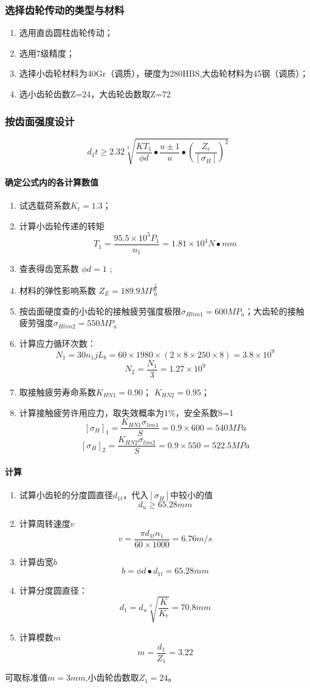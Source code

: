 \documentclass[a4paper,12pt]{article}
\begin{document}
\subsubsection{选择齿轮传动的类型与材料}
\begin{enumerate}
\item 选用直齿圆柱齿轮传动；
\item 选用7级精度；
\item 选择小齿轮材料为40Gr（调质），硬度为280HBS,大齿轮材料为45钢（调质）；
\item 选小齿轮齿数Z=24，大齿轮齿数取Z=72
\end{enumerate}

\subsubsection{按齿面强度设计}
$$  d_1t \geq 2.32\sqrt[3]{\frac{KT_1}{\phi d} \bullet \frac{u\pm 1}{u} \bullet \left( \frac{Z_e}{[\sigma _H]}   \right)^2} $$
\paragraph{确定公式内的各计算数值}
\begin{enumerate}
	\item 试选载荷系数$K_t=1.3$；
	\item 计算小齿轮传递的转矩  $$ T_1=\frac{95.5\times 10^5 P_1}{n_1}=1.81\times 10^4 N\bullet mm$$
	\item 查表得齿宽系数 $ \phi d=1$ ;
	\item 材料的弹性影响系数 $Z_E=189.9 MP_0^{\frac{1}{2}}$
	\item 按齿面硬度查的小齿轮的接触疲劳强度极限$\sigma _{H lim1}=600MP_a $；大齿轮的接触疲劳强度$\sigma _{H lim2}=550MP_a $
	\item 计算应力循环次数： $$N_1=30n_1jL_b=60\times 1980 \times (2\times 8\times 250\times 8)=3.8\times 10^9$$
	$$N_2=\frac{N_1}{3}=1.27\times 10^9$$
	\item 取接触疲劳寿命系数$K_{HN1}=0.90$； $K_{HN2}=0.95$；
	\item  计算接触疲劳许用应力，取失效概率为1\%，安全系数S=1
	 $$ [\sigma_H]_1= \frac{K_{HN1}\sigma_{lim1}}{S} =0.9\times 600=540MPa $$
	  $$ [\sigma_H]_2= \frac{K_{HN2}\sigma_{lim2}}{S} =0.9\times 550=522.5MPa $$
\end{enumerate}

\paragraph{计算}
\begin{enumerate}
\item 试算小齿轮的分度圆直径$d_{1t}$，代入$[\sigma _H]$中较小的值
$$d_u\geq 65.28mm$$
\item 计算周转速度$v$ $$v=\frac{\pi d_{1t}n_1}{60\times 1000}=6.76m/s$$ \item 计算齿宽$b$ $$ b=\phi d \bullet d_{1t}=65.28mm$$
\item 计算分度圆直径： $$ d_1= d_u \sqrt[3]{\frac{K}{K_t} }=70.8mm$$
\item 计算模数$m$ $$ m=\frac{d_1}{Z_1}=3.22$$
\end{enumerate}
	可取标准值$m=3mm$,小齿轮齿数取$Z_1=24$。
	
\end{document}
